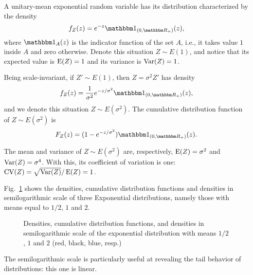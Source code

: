 A unitary-mean exponential random variable has its distribution characterized by the density
\begin{equation}
f_Z(z) = e^{-z} \mathbbm 1_{(0,\mathbbm R_+)}(z),
\end{equation}
where $\mathbbm 1_{A}(z)$ is the indicator function of the set $A$, i.e., it takes value $1$ inside $A$ and zero otherwise.
Denote this situation $Z\sim E(1)$, and notice that its expected value is $\operatorname{E}(Z)=1$ and its variance is $\operatorname{Var}(Z)=1$.

Being scale-invariant, if $Z'\sim E(1)$, then $Z=\sigma^2 Z'$ has density
\begin{equation}
f_Z(z) = \frac{1}{\sigma^2}e^{-z/\sigma^2} \mathbbm 1_{(0,\mathbbm R_+)}(z),
\end{equation}
and we denote this situation $Z\sim E(\sigma^2)$.
The cumulative distribution function of $Z\sim E(\sigma^2)$ is 
\begin{equation}
F_Z(z) = (1-e^{-z/\sigma^2}) \mathbbm 1_{(0,\mathbbm R_+)}(z).
\end{equation}

The mean and variance of $Z\sim E(\sigma^2)$ are, respectively, $\operatorname{E}(Z)=\sigma^2$ and $\operatorname{Var}(Z) = \sigma^4$.
With this, its coefficient of variation is one: $\operatorname{CV}(Z) = \sqrt{\operatorname{Var}(Z)}/\operatorname{E}(Z) = 1$.

Fig.~\ref{Fig:ExponentialDistribution} shows the densities, cumulative distribution functions and densities in semilogarithmic scale of three Exponential distributions, namely those with means equal to $1/2$, $1$ and $2$.

\begin{figure}[hbt]
\centering
{}
\caption{Densities, cumulative distribution functions, and densities in semilogarithmic scale of the exponential distribution with means $1/2$, $1$ and $2$ (red, black, blue, resp.)}\label{Fig:ExponentialDistribution}
\end{figure}

The semilogarithmic scale is particularly useful at revealing the tail behavior of distributions: this one is linear.

